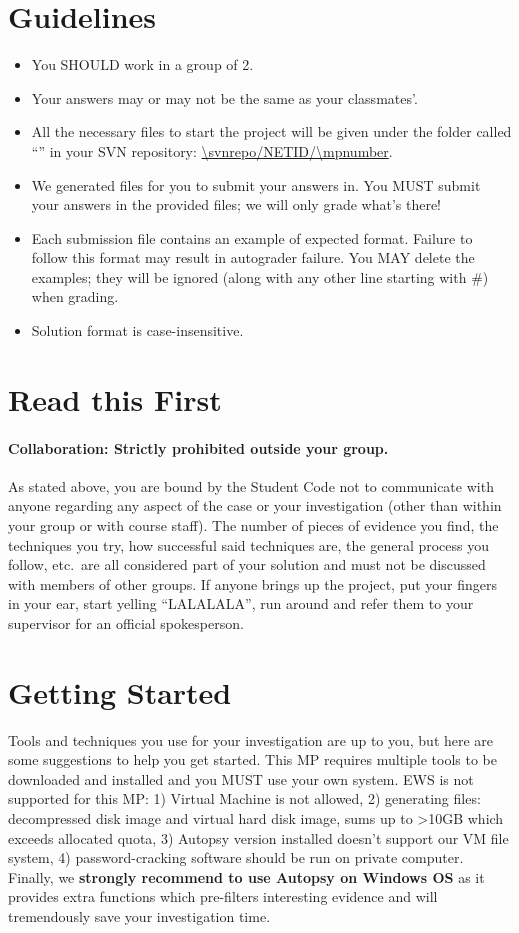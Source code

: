 \documentclass[letterpaper,12pt]{report}
\begin{document}
\section*{Guidelines}
\begin{itemize}
\item You SHOULD work in a group of 2.
\item Your answers may or may not be the same as your classmates'.
\item All the necessary files to start the project will be given under the folder called ``\mpnumber'' in your SVN repository: \url{\svnrepo/NETID/\mpnumber}.
\item We generated files for you to submit your answers in.  You MUST submit your answers in the provided files; we will only grade what's there!
\item Each submission file contains an example of expected format. Failure to follow this format may result in autograder failure. You MAY delete the examples; they will be ignored (along with any other line starting with \#) when grading.
\item Solution format is case-insensitive.
\end{itemize}

\section*{Read this First}
\paragraph{Collaboration: Strictly prohibited outside your group.}
As stated above, you are bound by the Student Code not to communicate with anyone regarding any aspect of the case or your investigation (other than within your group or with course staff).  The number of pieces of evidence you find, the techniques you try, how successful said techniques are, the general process you follow, etc.\ are all considered part of your solution and must not be discussed with members of other groups.  If anyone brings up the project, put your fingers in your ear, start yelling ``LALALALA'', run around and refer them to your supervisor for an official spokesperson.

\newpage

\section*{Getting Started}

Tools and techniques you use for your investigation are up to you, but here are some suggestions to help you get started. This MP requires multiple tools to be downloaded and installed and you MUST use your own system. EWS is not supported for this MP: 1) Virtual Machine is not allowed, 2) generating files: decompressed disk image and virtual hard disk image, sums up to >10GB which exceeds allocated quota, 3) Autopsy version installed doesn't support our VM file system, 4) password-cracking software should be run on private computer. Finally, we \textbf{strongly recommend to use Autopsy on Windows OS} as it provides extra functions which pre-filters interesting evidence and will tremendously save your investigation time.
\end{document}
